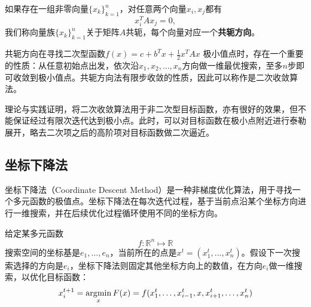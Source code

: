 \begin{definition}[共轭方向]
如果存在一组非零向量$\{x_k\}_{k=1}^n$，对任意两个向量$x_i,x_j$都有
\begin{equation}\label{eq:conjugatedirection2}
    x_i^T A x_j = 0,
\end{equation}
我们称向量族$\{x_k\}_{k=1}^n$关于矩阵$A$共轭，每个向量对应一个\textbf{共轭方向}。
\end{definition}

共轭方向在寻找二次型函数$f(x) = c + b^T x + \frac{1}{2} x^T A x$ 极小值点时，存在一个重要的性质：从任意初始点出发，依次沿$x_1,x_2,\ldots, x_n$方向做一维最优搜索，至多$n$步即可收敛到极小值点。共轭方向法有限步收敛的性质，因此可以称作是二次收敛算法。

理论与实践证明，将二次收敛算法用于非二次型目标函数，亦有很好的效果，但不能保证经过有限次迭代达到极小点。此时，可以对目标函数在极小点附近进行泰勒展开，略去二次项之后的高阶项对目标函数做二次逼近。

\subsection{坐标下降法}
坐标下降法（Coordinate Descent Method）是一种非梯度优化算法，用于寻找一个多元函数的极值点。坐标下降法在每次迭代过程，基于当前点沿某个坐标方向进行一维搜索，并在后续优化过程循环使用不同的坐标方向。

给定某多元函数
\[
    f:\mathbb R^n \mapsto \mathbb R
\]
搜索空间的坐标基是$e_1,\ldots,e_n$，当前所在的点是$x^t=(x_1^t,\ldots,x_n^t)$。假设下一次搜索选择的方向是$e_i$，坐标下降法则固定其他坐标方向上的数值，在方向$e_i$做一维搜索，以优化目标函数：
\begin{equation}
    x_i^{t+1} = \operatorname*{\mathrm{\arg\!\min}}\limits_{x} F(x) = f(x_1^t,\ldots,x_{i-1}^t,x,x_{i+1}^t,\ldots,x_n^t)
\end{equation}

